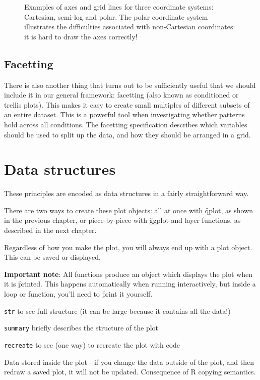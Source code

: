 \begin{figure}[htbp]
  \centering
  \caption{Examples of axes and grid lines for three coordinate systems: Cartesian, semi-log and polar. The polar coordinate system illustrates the difficulties associated with non-Cartesian coordinates: it is hard to draw the axes correctly!}
  \label{fig:coord}
\end{figure}

\subsection{Facetting}\label{sec:intro-facetting}

There is also another thing that turns out to be sufficiently useful that we should include it in our general framework: facetting (also known as conditioned or trellis plots). This makes it easy to create small multiples of different subsets of an entire dataset. This is a powerful tool when investigating whether patterns hold across all conditions.  The facetting specification describes which variables should be used to split up the data, and how they should be arranged in a grid.

\section{Data structures}
\label{sec:data-structures}

These principles are encoded as data structures in a fairly straightforward way.

There are two ways to create these plot objects: all at once with \f{qplot}, as shown in the previous chapter, or piece-by-piece with \f{ggplot} and layer functions, as described in the next chapter.

Regardless of how you make the plot, you will always end up with a plot object.  This can be saved or displayed.

{\bf Important note}: All \ggplot functions produce an object which displays the plot when it is \f{print}ed.  This happens automatically when
running interactively, but inside a loop or function, you'll need to
\f{print} it yourself.  

{\tt str} to see full structure (it can be large because it contains all the data!)

{\tt summary} briefly describes the structure of the plot

{\tt recreate} to see (one way) to recreate the plot with code 

Data stored inside the plot - if you change the data outside of the plot, and then redraw a saved plot, it will not be updated.  Consequence of R copying semantics.

